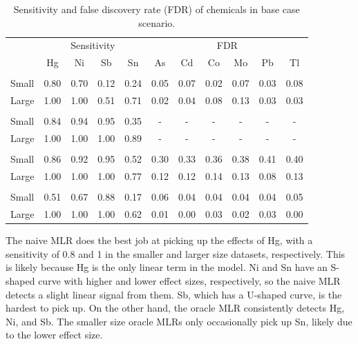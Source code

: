 \documentclass[12pt, twoside]{amherstthesis}
\begin{document}
\begin{table}

\caption{\label{tab:basecasetab}Sensitivity and false discovery rate (FDR) of chemicals in base case scenario.}
\centering
\begin{tabular}[t]{>{\raggedright\arraybackslash}p{6em}cccccccccc}
\toprule
\multicolumn{1}{c}{ } & \multicolumn{4}{c}{Sensitivity} & \multicolumn{6}{c}{FDR} \\
\cmidrule(l{3pt}r{3pt}){2-5} \cmidrule(l{3pt}r{3pt}){6-11}
 & Hg & Ni & Sb & Sn & As & Cd & Co & Mo & Pb & Tl\\
\midrule
\addlinespace[0.3em]
\multicolumn{11}{l}{\textbf{Naive MLR}}\\
\hspace{1em}Small & 0.80 & 0.70 & 0.12 & 0.24 & 0.05 & 0.07 & 0.02 & 0.07 & 0.03 & 0.08\\
\hspace{1em}Large & 1.00 & 1.00 & 0.51 & 0.71 & 0.02 & 0.04 & 0.08 & 0.13 & 0.03 & 0.03\\
\addlinespace[0.3em]
\multicolumn{11}{l}{\textbf{Oracle MLR}}\\
\hspace{1em}Small & 0.84 & 0.94 & 0.95 & 0.35 & - & - & - & - & - & -\\
\hspace{1em}Large & 1.00 & 1.00 & 1.00 & 0.89 & - & - & - & - & - & -\\
\addlinespace[0.3em]
\multicolumn{11}{l}{\textbf{BKMR}}\\
\hspace{1em}Small & 0.86 & 0.92 & 0.95 & 0.52 & 0.30 & 0.33 & 0.36 & 0.38 & 0.41 & 0.40\\
\hspace{1em}Large & 1.00 & 1.00 & 1.00 & 0.77 & 0.12 & 0.12 & 0.14 & 0.13 & 0.08 & 0.13\\
\addlinespace[0.3em]
\multicolumn{11}{l}{\textbf{BSR}}\\
\hspace{1em}Small & 0.51 & 0.67 & 0.88 & 0.17 & 0.06 & 0.04 & 0.04 & 0.04 & 0.04 & 0.05\\
\hspace{1em}Large & 1.00 & 1.00 & 1.00 & 0.62 & 0.01 & 0.00 & 0.03 & 0.02 & 0.03 & 0.00\\
\bottomrule
\end{tabular}
\end{table}
The naive MLR does the best job at picking up the effects of Hg, with a sensitivity of 0.8 and 1 in the smaller and larger size datasets, respectively. This is likely because Hg is the only linear term in the model. Ni and Sn have an S-shaped curve with higher and lower effect sizes, respectively, so the naive MLR detects a slight linear signal from them. Sb, which has a U-shaped curve, is the hardest to pick up. On the other hand, the oracle MLR consistently detects Hg, Ni, and Sb. The smaller size oracle MLRs only occasionally pick up Sn, likely due to the lower effect size.
\end{document}
